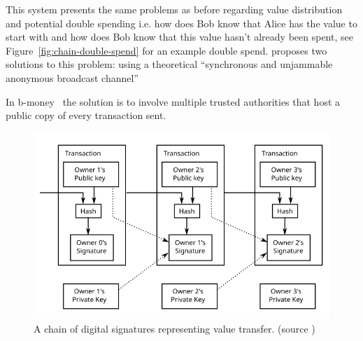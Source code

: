 This system presents the same problems as before regarding value distribution and potential double spending i.e. how does Bob know that Alice has the value to start with and how does Bob know that this value hasn't already been spent, see Figure~\ref{fig:chain-double-spend} for an example double spend. \textcite{b-money} proposes two solutions to this problem: using a theoretical ``synchronous and unjammable anonymous broadcast channel''

In b-money~\cite{b-money} the solution is to involve multiple trusted authorities that host a public copy of every transaction sent.

\begin{figure}[htb]
    \centering
    \includegraphics[width=0.9\columnwidth ]{img/Bitcoin_Transaction_Visual}
    \caption{A chain of digital signatures representing value transfer.
    (source \protect\cite{satoshi})}
    \label{fig:chain-spend}
\end{figure}

